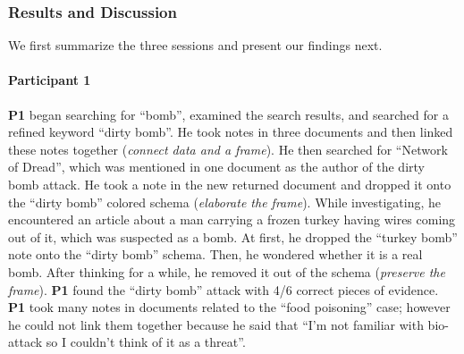 \subsubsection{Results and Discussion}
We first summarize the three sessions and present our findings next.

\paragraph{Participant 1}
\textbf{P1} began searching for ``bomb'', examined the search results, and searched for  a refined keyword ``dirty bomb''. He took notes in three documents and then linked these notes together (\emph{connect data and a frame}). He then searched for ``Network of Dread'', which was mentioned in one document as the author of the dirty bomb attack. He took a note in the new returned document and dropped it onto the ``dirty bomb'' colored schema (\emph{elaborate the frame}). While investigating, he encountered an article about a man carrying a frozen turkey having wires coming out of it, which was suspected as a bomb. At first, he dropped the ``turkey bomb'' note onto the ``dirty bomb'' schema. Then, he wondered whether it is a real bomb. After thinking for a while, he removed it out of the schema (\emph{preserve the frame}). \textbf{P1} found the ``dirty bomb'' attack with 4/6 correct pieces of evidence. \textbf{P1} took many notes in documents related to the ``food poisoning'' case; however he could not link them together because he said that ``I'm not familiar with bio-attack so I couldn't think of it as a threat''. 

